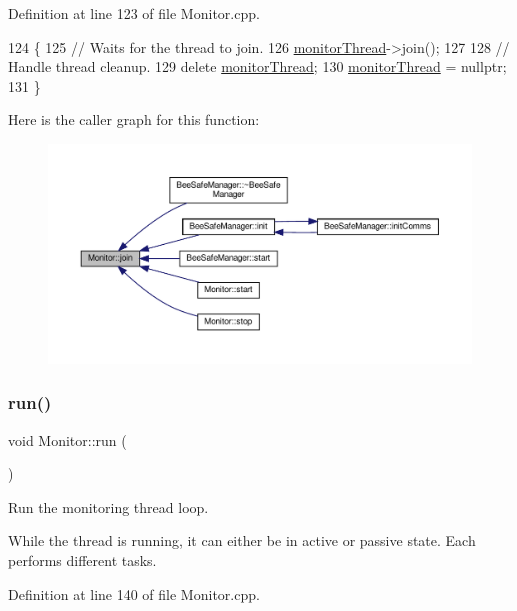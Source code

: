 Definition at line 123 of file Monitor.\+cpp.


\begin{DoxyCode}
124 \{
125     \textcolor{comment}{// Waits for the thread to join.}
126     \hyperlink{class_monitor_a1e6bfb7c47a223d8bdc537e2cff07822}{monitorThread}->join();
127 
128     \textcolor{comment}{// Handle thread cleanup.}
129     \textcolor{keyword}{delete} \hyperlink{class_monitor_a1e6bfb7c47a223d8bdc537e2cff07822}{monitorThread};
130     \hyperlink{class_monitor_a1e6bfb7c47a223d8bdc537e2cff07822}{monitorThread} = \textcolor{keyword}{nullptr};
131 \}
\end{DoxyCode}
Here is the caller graph for this function\+:\nopagebreak
\begin{figure}[H]
\begin{center}
\leavevmode
\includegraphics[width=350pt]{d9/df7/class_monitor_a2d2e309666c98333a317c9786f94f6ad_icgraph}
\end{center}
\end{figure}
\mbox{\label{class_monitor_a81666ecd4a8db05fd3090f7e47eca6ed}} 
\subsubsection{\texorpdfstring{run()}{run()}}
{\footnotesize\ttfamily void Monitor\+::run (\begin{DoxyParamCaption}{ }\end{DoxyParamCaption})\hspace{0.3cm}{\ttfamily [private]}}

Run the monitoring thread loop.

While the thread is running, it can either be in active or passive state. Each performs different tasks. 

Definition at line 140 of file Monitor.\+cpp.


